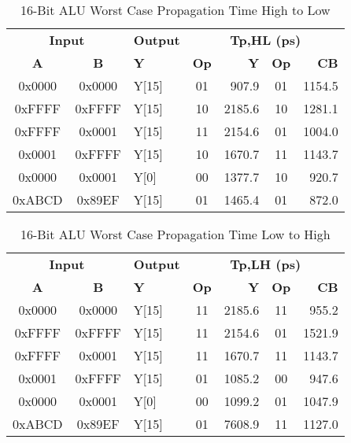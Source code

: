 \documentclass[11pt]{article}
\begin{document}
		
			\begin{table}[H]
				\centering
				\caption{16-Bit ALU Worst Case Propagation Time High to Low}
				\label{tab:ALU-16-Bit-Tpd-HL}
				\begin{tabular}{|cclcrcr|}
					\hline
					\multicolumn{2}{|c}{\textbf{Input}} & \textbf{Output} & \multicolumn{4}{c|}{\textbf{Tp,HL (ps)}} \\
					\textbf{A} & \textbf{B} & \textbf{Y} & \textbf{Op} & \textbf{Y} & \textbf{Op} & \textbf{CB} \\
					\hline
					0x0000 & 0x0000 & Y{[}15{]} & 01 & 907.9 & 01 & 1154.5 \\
					0xFFFF & 0xFFFF & Y{[}15{]} & 10 & 2185.6 & 10 & 1281.1 \\
					0xFFFF & 0x0001 & Y{[}15{]} & 11 & 2154.6 & 01 & 1004.0 \\
					0x0001 & 0xFFFF & Y{[}15{]} & 10 & 1670.7 & 11 & 1143.7 \\
					0x0000 & 0x0001 & Y{[}0{]} & 00 & 1377.7 & 10 & 920.7 \\
					0xABCD & 0x89EF & Y{[}15{]} & 01 & 1465.4 & 01 & 872.0 \\
					\hline
				\end{tabular}
			\end{table}
		
		
			\begin{table}[H]
				\centering
				\caption{16-Bit ALU Worst Case Propagation Time Low to High}
				\label{tab:ALU-16-Bit-Tpd-LH}
				\begin{tabular}{|cclcrcr|}
					\hline
					\multicolumn{2}{|c}{\textbf{Input}} & \textbf{Output} & \multicolumn{4}{c|}{\textbf{Tp,LH (ps)}} \\
					\textbf{A} & \textbf{B} & \textbf{Y} & \textbf{Op} & \textbf{Y} & \textbf{Op} & \textbf{CB} \\
					\hline
					0x0000 & 0x0000 & Y{[}15{]} & 11 & 2185.6 & 11 & 955.2 \\
					0xFFFF & 0xFFFF & Y{[}15{]} & 11 & 2154.6 & 01 & 1521.9 \\
					0xFFFF & 0x0001 & Y{[}15{]} & 11 & 1670.7 & 11 & 1143.7 \\
					0x0001 & 0xFFFF & Y{[}15{]} & 01 & 1085.2 & 00 & 947.6 \\
					0x0000 & 0x0001 & Y{[}0{]} & 00 & 1099.2 & 01 & 1047.9 \\
					0xABCD & 0x89EF & Y{[}15{]} & 01 & 7608.9 & 11 & 1127.0 \\
					\hline
				\end{tabular}
			\end{table}
		
\end{document}
